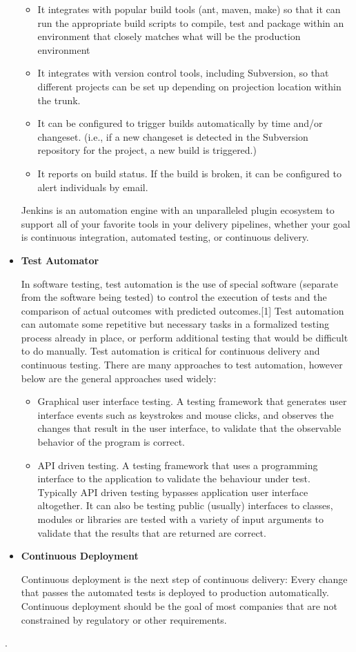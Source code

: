 \documentclass[12pt,a4paper,oneside]{report}
\begin{document}
\begin{itemize}
\begin{itemize}
\item It integrates with popular build tools (ant, maven, make) so that it can run the appropriate build scripts to compile, test and package within an environment that closely matches what will be the production environment
\item It integrates with version control tools, including Subversion, so that different projects can be set up depending on projection location within the trunk.
\item It can be configured to trigger builds automatically by time and/or changeset. (i.e., if a new changeset is detected in the Subversion repository for the project, a new build is triggered.)
\item It reports on build status. If the build is broken, it can be configured to alert individuals by email.
\end{itemize}


Jenkins is an automation engine with an unparalleled plugin ecosystem to support all of your favorite tools in your delivery pipelines, whether your goal is continuous integration, automated testing, or continuous delivery. 
 \item  \textbf{Test Automator}
\par In software testing, test automation is the use of special software (separate from the software being tested) to control the execution of tests and the comparison of actual outcomes with predicted outcomes.[1] Test automation can automate some repetitive but necessary tasks in a formalized testing process already in place, or perform additional testing that would be difficult to do manually. Test automation is critical for continuous delivery and continuous testing. There are many approaches to test automation, however below are the general approaches used widely:

\begin{itemize}
\item Graphical user interface testing. A testing framework that generates user interface events such as keystrokes and mouse clicks, and observes the changes that result in the user interface, to validate that the observable behavior of the program is correct.
\item API driven testing. A testing framework that uses a programming interface to the application to validate the behaviour under test. Typically API driven testing bypasses application user interface altogether. It can also be testing public (usually) interfaces to classes, modules or libraries are tested with a variety of input arguments to validate that the results that are returned are correct.
\end{itemize}


\item \textbf{Continuous Deployment}
\par Continuous deployment is the next step of continuous delivery: Every change that passes the automated tests is deployed to production automatically. Continuous deployment should be the goal of most companies that are not constrained by regulatory or other requirements.

\end{itemize} . 
\end{document}
